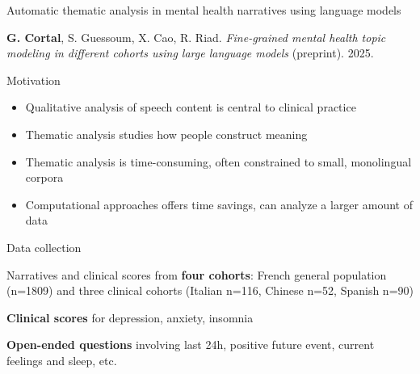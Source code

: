 \documentclass[handout,10pt]{beamer}
\begin{document}
\begin{frame}{}
\Large
\vfill
\begin{center}
    Automatic thematic analysis in mental health narratives using language models%
\end{center}

\vfill

\footnotesize

\textbf{G. Cortal}, S. Guessoum, X. Cao, R. Riad. \textit{Fine-grained mental health topic modeling in different cohorts using large language models} (preprint). 2025. 

\end{frame}

\begin{frame}{Motivation}

  \begin{itemize}[<+->]
    \item Qualitative analysis of speech content is central to clinical practice
    \item Thematic analysis studies how people construct meaning%
    \item Thematic analysis is time-consuming, often constrained to small, monolingual corpora
    \item Computational approaches offers time savings, can analyze a larger amount of data
  \end{itemize}



\end{frame}
  

\begin{frame}{Data collection}

Narratives and clinical scores from \textbf{four cohorts}: French general population (n=1809) and three clinical cohorts (Italian n=116, Chinese n=52, Spanish n=90)

\vspace{0.5cm}
\pause

\textbf{Clinical scores} for depression, anxiety, insomnia

\vspace{0.5cm}
\pause

\textbf{Open-ended questions} involving last 24h, positive future event, current feelings and sleep, etc.

\end{frame}
\end{document}
